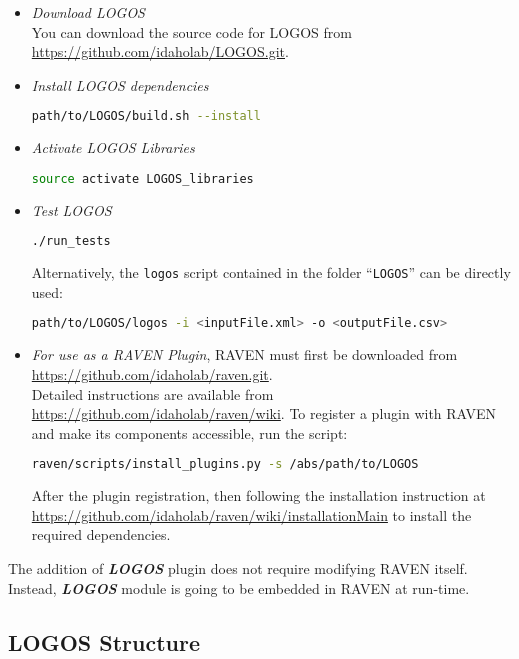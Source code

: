 \begin{itemize}
  \item \textit{Download LOGOS}
    \\ You can download the source code for LOGOS from \url{https://github.com/idaholab/LOGOS.git}.
  \item \textit{Install LOGOS dependencies}
	\begin{lstlisting}[language=bash]
	path/to/LOGOS/build.sh --install
	\end{lstlisting}
  \item \textit{Activate LOGOS Libraries}
  \begin{lstlisting}[language=bash]
  source activate LOGOS_libraries
  \end{lstlisting}
  \item \textit{Test LOGOS}
	\begin{lstlisting}[language=bash]
	./run_tests
	\end{lstlisting}
  	Alternatively, the \texttt{logos} script
    contained in the folder ``\texttt{LOGOS}'' can be directly used:
\begin{lstlisting}[language=bash]
path/to/LOGOS/logos -i <inputFile.xml> -o <outputFile.csv>
\end{lstlisting}
	\item \textit{For use as a RAVEN Plugin}, RAVEN must first be downloaded from
  \url{https://github.com/idaholab/raven.git}.
		\\ Detailed instructions are available from \url{https://github.com/idaholab/raven/wiki}.
    To register a plugin with RAVEN and make its components accessible, run the script:
    \begin{lstlisting}[language=bash]
  	raven/scripts/install_plugins.py -s /abs/path/to/LOGOS
  	\end{lstlisting}
    After the plugin registration, then following the installation instruction at
    \url{https://github.com/idaholab/raven/wiki/installationMain} to install the
    required dependencies.
\end{itemize}

The addition of \textit{\textbf{LOGOS}} plugin does not require modifying RAVEN
itself. Instead, \textit{\textbf{LOGOS}} module is going to be embedded in
RAVEN at run-time.

\subsection{LOGOS Structure}




